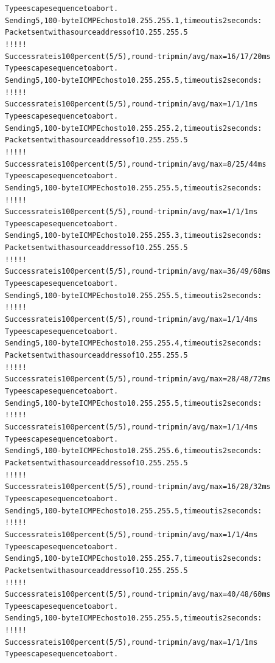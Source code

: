 \documentclass[12pt,twoside,a4paper]{report}
\begin{document}
\noindent
{\selectfont
\begin{small}
\begin{alltt}
Type escape sequence to abort.
Sending 5, 100-byte ICMP Echos to 10.255.255.1, timeout is 2 seconds:
Packet sent with a source address of 10.255.255.5 
!!!!!
Success rate is 100 percent (5/5), round-trip min/avg/max = 16/17/20 ms
Type escape sequence to abort.
Sending 5, 100-byte ICMP Echos to 10.255.255.5, timeout is 2 seconds:
!!!!!
Success rate is 100 percent (5/5), round-trip min/avg/max = 1/1/1 ms
Type escape sequence to abort.
Sending 5, 100-byte ICMP Echos to 10.255.255.2, timeout is 2 seconds:
Packet sent with a source address of 10.255.255.5 
!!!!!
Success rate is 100 percent (5/5), round-trip min/avg/max = 8/25/44 ms
Type escape sequence to abort.
Sending 5, 100-byte ICMP Echos to 10.255.255.5, timeout is 2 seconds:
!!!!!
Success rate is 100 percent (5/5), round-trip min/avg/max = 1/1/1 ms
Type escape sequence to abort.
Sending 5, 100-byte ICMP Echos to 10.255.255.3, timeout is 2 seconds:
Packet sent with a source address of 10.255.255.5 
!!!!!
Success rate is 100 percent (5/5), round-trip min/avg/max = 36/49/68 ms
Type escape sequence to abort.
Sending 5, 100-byte ICMP Echos to 10.255.255.5, timeout is 2 seconds:
!!!!!
Success rate is 100 percent (5/5), round-trip min/avg/max = 1/1/4 ms
Type escape sequence to abort.
Sending 5, 100-byte ICMP Echos to 10.255.255.4, timeout is 2 seconds:
Packet sent with a source address of 10.255.255.5 
!!!!!
Success rate is 100 percent (5/5), round-trip min/avg/max = 28/48/72 ms
Type escape sequence to abort.
Sending 5, 100-byte ICMP Echos to 10.255.255.5, timeout is 2 seconds:
!!!!!
Success rate is 100 percent (5/5), round-trip min/avg/max = 1/1/4 ms
Type escape sequence to abort.
Sending 5, 100-byte ICMP Echos to 10.255.255.6, timeout is 2 seconds:
Packet sent with a source address of 10.255.255.5 
!!!!!
Success rate is 100 percent (5/5), round-trip min/avg/max = 16/28/32 ms
Type escape sequence to abort.
Sending 5, 100-byte ICMP Echos to 10.255.255.5, timeout is 2 seconds:
!!!!!
Success rate is 100 percent (5/5), round-trip min/avg/max = 1/1/4 ms
Type escape sequence to abort.
Sending 5, 100-byte ICMP Echos to 10.255.255.7, timeout is 2 seconds:
Packet sent with a source address of 10.255.255.5 
!!!!!
Success rate is 100 percent (5/5), round-trip min/avg/max = 40/48/60 ms
Type escape sequence to abort.
Sending 5, 100-byte ICMP Echos to 10.255.255.5, timeout is 2 seconds:
!!!!!
Success rate is 100 percent (5/5), round-trip min/avg/max = 1/1/1 ms
Type escape sequence to abort.

\end{alltt}
\end{small}}
\end{document}
